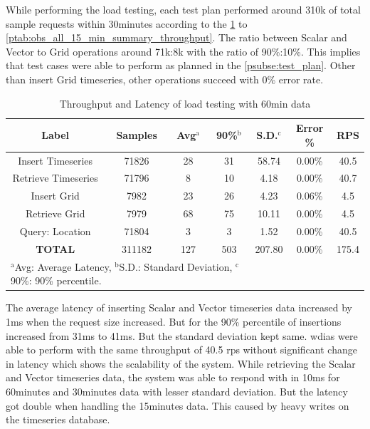 \documentclass[conference]{IEEEtran}
\begin{document}
While performing the load testing, each test plan performed around 310k of total sample requests within 30minutes according to the \cref{ptab:obs_all_60_min_summary_throughput} to \cref{ptab:obs_all_15_min_summary_throughput}. The ratio between Scalar and Vector to Grid operations around 71k:8k with the ratio of 90\%:10\%. This implies that test cases were able to perform as planned in the \cref{psubse:test_plan}.
Other than insert Grid timeseries, other operations succeed with 0\% error rate.

\begin{table}[htbp]
\caption{ Throughput and Latency of load testing with 60min data}
\begin{center}
\footnotesize
\begin{adjustbox}{width=0.49\textwidth}
\begin{tabular}{|c|c|c|c|c|c|c|}
\hline
\textbf{Label} & \textbf{Samples} & \textbf{Avg$^{\mathrm{a}}$} & \textbf{90\%$^{\mathrm{b}}$} & \textbf{S.D.$^{\mathrm{c}}$} & \textbf{Error \%} & \textbf{RPS} \\ \hline
Insert Timeseries & 71826 & 28 & 31 & 58.74 & 0.00\% & 40.5 \\ \hline
Retrieve Timeseries & 71796 & 8 & 10 & 4.18 & 0.00\% & 40.7 \\ \hline
Insert Grid & 7982 & 23 & 26 & 4.23 & 0.06\% & 4.5 \\ \hline
Retrieve Grid & 7979 & 68 & 75 & 10.11 & 0.00\% & 4.5 \\ \hline
Query: Location & 71804 & 3 & 3 & 1.52 & 0.00\% & 40.5 \\ \hline
\textbf{TOTAL} & 311182 & 127 & 503 & 207.80 & 0.00\% & 175.4 \\ \hline
\multicolumn{4}{l}{$^{\mathrm{a}}$Avg: Average Latency, $^{\mathrm{b}}$S.D.: Standard Deviation, $^{\mathrm{c}}$90\%: 90\% percentile.}
\end{tabular}
\end{adjustbox}
\label{ptab:obs_all_60_min_summary_throughput}
\end{center}
\end{table}

The average latency of inserting Scalar and Vector timeseries data increased by 1ms when the request size increased. But for the 90\% percentile of insertions increased from 31ms to 41ms. But the standard deviation kept same. \acrshort{wdias} were able to perform with the same throughput of 40.5 \acrshort{rps} without significant change in latency which shows the scalability of the system.
While retrieving the Scalar and Vector timeseries data, the system was able to respond with in 10ms for 60minutes and 30minutes data with lesser standard deviation. But the latency got double when handling the 15minutes data. This caused by heavy writes on the timeseries database.
\end{document}
